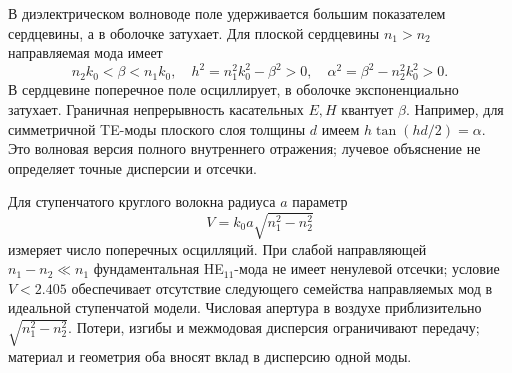 
В диэлектрическом волноводе поле удерживается большим показателем сердцевины, а в оболочке затухает. Для плоской сердцевины $n_1>n_2$ направляемая мода имеет
\begin{equation}
 n_2k_0<\beta<n_1k_0,\quad
 h^2=n_1^2k_0^2-\beta^2>0,\quad
 \alpha^2=\beta^2-n_2^2k_0^2>0.
\end{equation}
В сердцевине поперечное поле осциллирует, в оболочке экспоненциально затухает. Граничная непрерывность касательных $E,H$ квантует $\beta$. Например, для симметричной TE-моды плоского слоя толщины $d$ имеем $h\tan(hd/2)=\alpha$. Это волновая версия полного внутреннего отражения; лучевое объяснение не определяет точные дисперсии и отсечки.

Для ступенчатого круглого волокна радиуса $a$ параметр
\begin{equation}
 V=k_0a\sqrt{n_1^2-n_2^2}
\end{equation}
измеряет число поперечных осцилляций. При слабой направляющей $n_1-n_2\ll n_1$ фундаментальная HE$_{11}$-мода не имеет ненулевой отсечки; условие $V<2.405$ обеспечивает отсутствие следующего семейства направляемых мод в идеальной ступенчатой модели. Числовая апертура в воздухе приблизительно $\sqrt{n_1^2-n_2^2}$. Потери, изгибы и межмодовая дисперсия ограничивают передачу; материал и геометрия оба вносят вклад в дисперсию одной моды.
